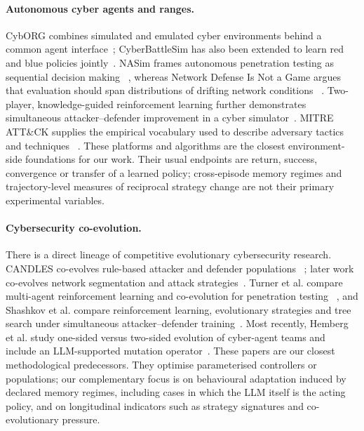 \paragraph{Autonomous cyber agents and ranges.}
CybORG combines simulated and emulated cyber environments behind a common
agent interface~\cite{standen2021cyborg}; CyberBattleSim has also been extended
to learn red and blue policies jointly~\cite{kunz2022multiagent}. NASim frames
autonomous penetration testing as sequential decision making
~\cite{schwartz2019autonomous}, whereas Network Defense Is Not a Game argues
that evaluation should span distributions of drifting network conditions
~\cite{molina2021network}. Two-player, knowledge-guided reinforcement learning
further demonstrates simultaneous attacker--defender improvement in a cyber
simulator~\cite{piplai2022knowledge}. MITRE ATT\&CK supplies the empirical
vocabulary used to describe adversary tactics and techniques
~\cite{strom2020attck}. These platforms and algorithms are the closest
environment-side foundations for our work. Their usual endpoints are return,
success, convergence or transfer of a learned policy; cross-episode memory
regimes and trajectory-level measures of reciprocal strategy change are not
their primary experimental variables.

\paragraph{Cybersecurity co-evolution.}
There is a direct lineage of competitive evolutionary cybersecurity research.
CANDLES co-evolves rule-based attacker and defender populations
~\cite{rush2015candles}; later work co-evolves network segmentation and attack
strategies~\cite{hemberg2018adversarial}. Turner et al. compare multi-agent
reinforcement learning and co-evolution for penetration testing
~\cite{turner2022analyzing}, and Shashkov et al. compare reinforcement
learning, evolutionary strategies and tree search under simultaneous
attacker--defender training~\cite{shashkov2023adversarial}. Most recently,
Hemberg et al. study one-sided versus two-sided evolution of cyber-agent teams
and include an LLM-supported mutation operator~\cite{hemberg2025evolutionary}.
These papers are our closest methodological predecessors. They optimise
parameterised controllers or populations; our complementary focus is on
behavioural adaptation induced by declared memory regimes, including cases in
which the LLM itself is the acting policy, and on longitudinal indicators such
as strategy signatures and co-evolutionary pressure.

